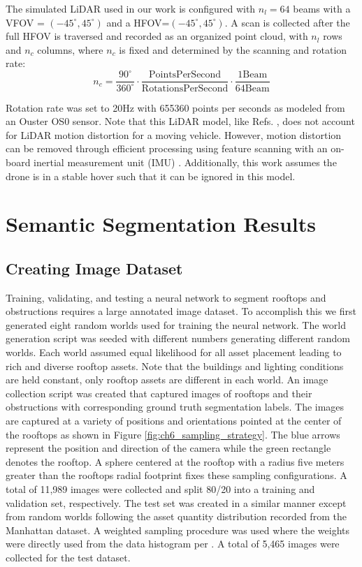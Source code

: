 The simulated LiDAR used in our work is configured with $n_l=64$ beams with a VFOV = $(-45^{\circ}, 45^{\circ})$ and a HFOV=$(-45^{\circ}, 45^{\circ})$. A scan is collected after the full HFOV is traversed and recorded as an organized point cloud, with $n_l$ rows and $n_c$ columns, where  $n_c$ is fixed and determined by the scanning and rotation rate:
$$
n_c = \frac{90^{\circ}}{360^{\circ}} \cdot \frac{\text{PointsPerSecond}}{\text{RotationsPerSecond} } \cdot \frac{1 \text{Beam}}{64 \text{Beam}}
$$

Rotation rate was set to 20Hz with 655360 points per seconds as modeled from an Ouster OS0 sensor\cite{ouster_os0}. Note that this LiDAR model, like Refs. \cite{schaefer_maximum_2019, koenig_design_2004}, does not account for LiDAR motion distortion for a moving vehicle. However, motion distortion can be removed through efficient processing using feature scanning with an on-board inertial measurement unit (IMU) \cite{mohamed_survey_2019, zhang_point_2019}. Additionally, this work assumes the drone is in a stable hover such that it can be ignored in this model.

\section{Semantic Segmentation Results}\label{sec:ch6_segmention_results}

\subsection{Creating Image Dataset}

Training, validating, and testing a neural network to segment rooftops and obstructions requires a large annotated image dataset. To accomplish this we first generated eight random worlds used for training the neural network.  The world generation script was seeded with different numbers generating different random worlds. Each world assumed equal likelihood for all asset placement leading to rich and diverse rooftop assets. Note that the buildings and lighting conditions are held constant, only rooftop assets are different in each world. An image collection script was created that captured images of rooftops and their obstructions with corresponding ground truth segmentation labels.  The images are captured at a variety of positions and orientations pointed at the center of the rooftops as shown in Figure \ref{fig:ch6_sampling_strategy}. The blue arrows represent the position and direction of the camera while the green rectangle denotes the rooftop. A sphere centered at the rooftop with a radius five meters greater than the rooftops radial footprint fixes these sampling configurations. A total of 11,989 images were collected and split 80/20 into a training and validation set, respectively. The test set was created in a similar manner except from random worlds following the asset quantity distribution recorded from the Manhattan dataset.  A weighted sampling procedure was used where the weights were directly used from the data histogram per \cite{Efraimidis2008}. A total of 5,465 images were collected for the test dataset.

